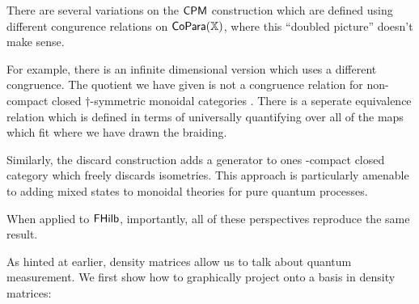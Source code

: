 There are several variations on the $\mathsf{CPM}$ construction which are defined using different congurence relations on ${{\sf CoPara}}(\mathbb{X})$, where this ``doubled picture'' doesn't make sense. 

For example, there is an infinite dimensional version which uses a different congruence. The quotient we have given is not a congruence relation for non-compact closed $\dag$-symmetric monoidal categories \cite{cpinf}.  There is a seperate equivalence relation which is defined in terms of universally quantifying over all of the maps which fit where we have drawn the braiding.


Similarly, the discard construction \cite{???} adds a generator to ones \dag-compact closed category which freely discards isometries. This approach is particularly amenable to adding mixed states to monoidal theories for pure quantum processes.

When applied to $\mathsf{FHilb}$, importantly, all of these perspectives reproduce the same result.


As hinted at earlier, density matrices allow us to talk about quantum measurement.  We first show how to graphically project onto a basis in density matrices:

